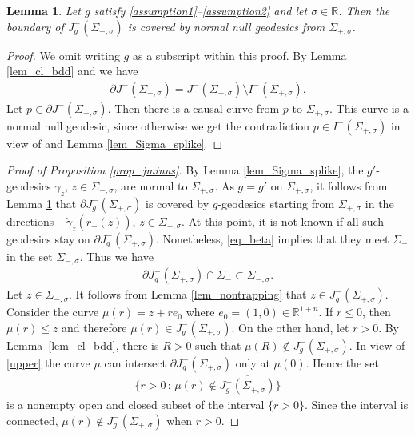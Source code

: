 \documentclass[11pt,letterpaper]{amsart}
\newtheorem{Lemma}[Theorem]{Lemma}
\theoremstyle{definition}
\numberwithin{equation}{section}
\newcommand{\p}{\partial}
\def\p{\partial}
\def\R{\mathbb R}
\begin{document}
\begin{Lemma}\label{lem_bd_null}
Let $g$ satisfy \eqref{assumption1}--\eqref{assumption2} and let $\sigma \in \R$. Then the boundary of $J_{g}^-(\Sigma_{+,\sigma})$ is covered by normal null geodesics from $\Sigma_{+,\sigma}$.
\end{Lemma}
\begin{proof}
We omit writing $g$ as a subscript within this proof. 
By Lemma \ref{lem_cl_bdd} and \cite[Lemma 6, p.\ 404]{oneill1983} we have 
    \begin{align*}
\p J^-(\Sigma_{+,\sigma}) = J^-(\Sigma_{+,\sigma}) \setminus I^-(\Sigma_{+,\sigma}).
    \end{align*}
Let $p \in \p J^-(\Sigma_{+,\sigma})$. Then there is a causal curve from $p$ to $\Sigma_{+,\sigma}$. This curve is a normal null geodesic, since otherwise we get the contradiction $p \in I^-(\Sigma_{+,\sigma})$ in view of \cite[Theorem 51, p.\ 298]{oneill1983} and Lemma \ref{lem_Sigma_splike}. 
\end{proof}

\begin{proof}[Proof of Proposition \ref{prop_jminus}]
By Lemma \ref{lem_Sigma_splike}, 
the $g'$-geodesics $\gamma_z$, $z \in \Sigma_{-,\sigma}$, are normal to $\Sigma_{+,\sigma}$. As $g = g'$ on $\Sigma_{+,\sigma}$, it follows from Lemma \ref{lem_bd_null} that 
$\p J_{g}^-(\Sigma_{+,\sigma})$ is covered by $g$-geodesics starting from $\Sigma_{+,\sigma}$ in the directions $-\dot \gamma_z(r_+(z))$, $z \in \Sigma_{-,\sigma}$.
At this point, it is not known if all such geodesics stay on $\p J_{g}^-(\Sigma_{+,\sigma})$. Nonetheless,
\eqref{eq_beta} implies that they meet $\Sigma_-$ in the set $\Sigma_{-,\sigma}$. Thus we have 
    \begin{align}\label{upper}
\p J_{g}^-(\Sigma_{+,\sigma}) \cap \Sigma_- \subset \Sigma_{-,\sigma}.
    \end{align}
Let $z \in \Sigma_{-,\sigma}$. It follows from Lemma \ref{lem_nontrapping} that $z \in J_{g}^-(\Sigma_{+,\sigma})$. Consider the curve $\mu(r) = z + r e_0$ where $e_0 = (1,0) \in \R^{1+n}$.
If $r \le 0$, then $\mu(r) \le z$ and therefore $\mu(r) \in J_{g}^-(\Sigma_{+,\sigma})$.
On the other hand, let $r > 0$. 
By Lemma~\ref{lem_cl_bdd}, there is $R > 0$ such that $\mu(R) \not\in J_{g}^-(\Sigma_{+,\sigma})$. In view of \eqref{upper} the curve $\mu$ can intersect $\p J_{g}^-(\Sigma_{+,\sigma})$ only at $\mu(0)$. Hence the set 
    \begin{align*}
\{ r > 0 \,:\, \mu(r) \notin \overline{J_{g}^-(\Sigma_{+,\sigma})} \}
    \end{align*}
is a nonempty open and closed subset of the interval $\{ r > 0 \}$. Since the interval is connected, $\mu(r) \not\in J_{g}^-(\Sigma_{+,\sigma})$ when $r > 0$.
\end{proof}
\end{document}
